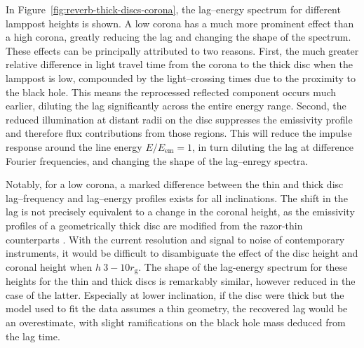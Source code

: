 \documentclass[fleqn,usenatbib]{mnras}
\begin{document}
In Figure~\ref{fig:reverb-thick-discs-corona}, the lag--energy spectrum for
different lamppost heights is shown. A low corona has a much more prominent
effect than a high corona, greatly reducing the lag and changing the shape of
the spectrum. These effects can be principally attributed to two reasons. First,
the much greater relative difference in light travel time from the corona to the
thick disc when the lamppost is low, compounded by the light--crossing times due
to the proximity to the black hole. This means the reprocessed reflected
component occurs much earlier, diluting the lag significantly across the entire
energy range. Second, the reduced illumination at distant radii on the disc
suppresses the emissivity profile and therefore flux contributions from those
regions. This will reduce the impulse response around the line energy $E /
E_\text{em} =
1$, in turn diluting the lag at difference Fourier frequencies, and changing the
shape of the lag--enregy spectra.

Notably, for a low corona, a marked difference between the thin and thick disc
lag--frequency and lag--energy profiles exists for all inclinations. The shift
in the lag is not precisely equivalent to a change in the coronal height, as the
emissivity profiles of a geometrically thick disc are modified from the
razor-thin counterparts \citep{taylor_x-ray_2018}. With the current resolution
and signal to noise of contemporary instruments, it would be difficult to
disambiguate the effect of the disc height and coronal height when $h ~ 3 - 10
r_\text{g}$. The shape of the lag-energy spectrum for these heights for the thin
and thick discs is remarkably similar, however reduced in the case of the
latter. Especially at lower inclination, if the disc were thick but the model
used to fit the data assumes a thin geometry, the recovered lag would be an
overestimate, with slight ramifications on the black hole mass deduced from the
lag time.
\end{document}
